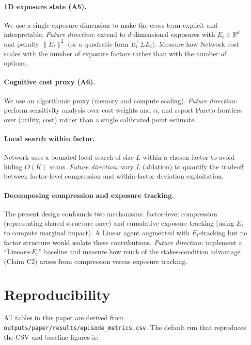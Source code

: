 \documentclass[11pt]{article}
\begin{document}
\paragraph{1D exposure state (A5).}
We use a single exposure dimension to make the cross-term explicit and interpretable.
\emph{Future direction:} extend to $d$-dimensional exposures with $E_t\in\mathbb{R}^d$ and penalty $\|E_t\|^2$ (or a quadratic form $E_t^\top \Sigma E_t$). Measure how Network cost scales with the number of exposure factors rather than with the number of options.

\paragraph{Cognitive cost proxy (A6).}
We use an algorithmic proxy (memory and compute scaling).
\emph{Future direction:} perform sensitivity analysis over cost weights and $\alpha$, and report Pareto frontiers over (utility, cost) rather than a single calibrated point estimate.

\paragraph{Local search within factor.}
Network uses a bounded local search of size $L$ within a chosen factor to avoid hiding $O(K)$ scans.
\emph{Future direction:} vary $L$ (ablation) to quantify the tradeoff between factor-level compression and within-factor deviation exploitation.

\paragraph{Decomposing compression and exposure tracking.}
The present design confounds two mechanisms: factor-level compression (representing shared structure once) and cumulative exposure tracking (using $E_t$ to compute marginal impact). A Linear agent augmented with $E_t$-tracking but no factor structure would isolate these contributions.
\emph{Future direction:} implement a ``Linear+$E_t$'' baseline and measure how much of the stakes-condition advantage (Claim C2) arises from compression versus exposure tracking.


\section{Reproducibility}\label{sec:repro}

All tables in this paper are derived from \texttt{outputs/paper/results/episode\_metrics.csv}. The default run that reproduces the CSV and baseline figures is:
\end{document}
